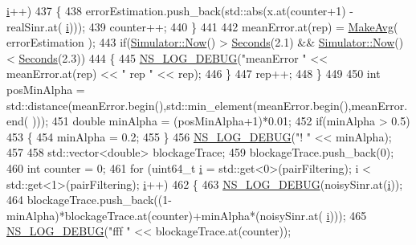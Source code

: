 \begin{DoxyCode}
      \hyperlink{bernuolliDistribution_8m_a6f6ccfcf58b31cb6412107d9d5281426}{i}++)
437                 \{
438                         errorEstimation.push\_back(std::abs(x.at(counter+1) - realSinr.at(
      \hyperlink{bernuolliDistribution_8m_a6f6ccfcf58b31cb6412107d9d5281426}{i})));
439                         counter++;
440                 \}       
441 
442                 meanError.at(rep) = \hyperlink{classns3_1_1MmWaveEnbPhy_ac8702bd18540548b2b3c22e6f321f2d4}{MakeAvg}( errorEstimation );
443                 \textcolor{keywordflow}{if}(\hyperlink{classns3_1_1Simulator_ac3178fa975b419f7875e7105be122800}{Simulator::Now}() > \hyperlink{group__timecivil_ga33c34b816f8ff6628e33d5c8e9713b9e}{Seconds}(2.1) && 
      \hyperlink{classns3_1_1Simulator_ac3178fa975b419f7875e7105be122800}{Simulator::Now}() < \hyperlink{group__timecivil_ga33c34b816f8ff6628e33d5c8e9713b9e}{Seconds}(2.3))
444                 \{
445                         \hyperlink{group__logging_ga413f1886406d49f59a6a0a89b77b4d0a}{NS\_LOG\_DEBUG}(\textcolor{stringliteral}{"meanError "} << meanError.at(rep) << \textcolor{stringliteral}{" rep "} << rep);  
446                 \}
447                 rep++;
448         \}
449 
450         \textcolor{keywordtype}{int} posMinAlpha = std::distance(meanError.begin(),std::min\_element(meanError.begin(),meanError.end(
      )));
451         \textcolor{keywordtype}{double} minAlpha = (posMinAlpha+1)*0.01;
452         \textcolor{keywordflow}{if}(minAlpha > 0.5)
453         \{
454                 minAlpha = 0.2;
455         \}
456         \hyperlink{group__logging_ga413f1886406d49f59a6a0a89b77b4d0a}{NS\_LOG\_DEBUG}(\textcolor{stringliteral}{"! "} << minAlpha);
457                 
458         std::vector<double> blockageTrace;
459         blockageTrace.push\_back(0);
460         \textcolor{keywordtype}{int} counter = 0;
461         \textcolor{keywordflow}{for} (uint64\_t \hyperlink{bernuolliDistribution_8m_a6f6ccfcf58b31cb6412107d9d5281426}{i} = std::get<0>(pairFiltering); i < std::get<1>(pairFiltering); 
      \hyperlink{bernuolliDistribution_8m_a6f6ccfcf58b31cb6412107d9d5281426}{i}++)
462         \{
463                 \hyperlink{group__logging_ga413f1886406d49f59a6a0a89b77b4d0a}{NS\_LOG\_DEBUG}(noisySinr.at(\hyperlink{bernuolliDistribution_8m_a6f6ccfcf58b31cb6412107d9d5281426}{i}));
464                 blockageTrace.push\_back((1-minAlpha)*blockageTrace.at(counter)+minAlpha*(noisySinr.at(
      \hyperlink{bernuolliDistribution_8m_a6f6ccfcf58b31cb6412107d9d5281426}{i})));
465                 \hyperlink{group__logging_ga413f1886406d49f59a6a0a89b77b4d0a}{NS\_LOG\_DEBUG}(\textcolor{stringliteral}{"fff "} << blockageTrace.at(counter));

\end{DoxyCode}

